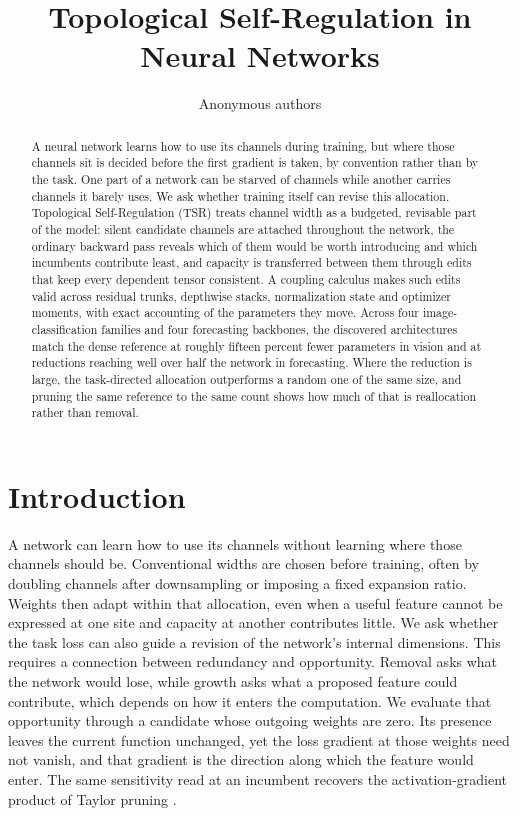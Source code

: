 \documentclass[10pt]{article}
\title{Topological Self-Regulation in Neural Networks}
\author{Anonymous authors}
\date{}
\theoremstyle{paper}
\begin{document}
\maketitle
\begin{abstract}
A neural network learns how to use its channels during training, but where those channels sit is decided before the first gradient is taken, by convention rather than by the task. One part of a network can be starved of channels while another carries channels it barely uses. We ask whether training itself can revise this allocation. Topological Self-Regulation (TSR) treats channel width as a budgeted, revisable part of the model: silent candidate channels are attached throughout the network, the ordinary backward pass reveals which of them would be worth introducing and which incumbents contribute least, and capacity is transferred between them through edits that keep every dependent tensor consistent. A coupling calculus makes such edits valid across residual trunks, depthwise stacks, normalization state and optimizer moments, with exact accounting of the parameters they move. Across four image-classification families and four forecasting backbones, the discovered architectures match the dense reference at roughly fifteen percent fewer parameters in vision and at reductions reaching well over half the network in forecasting. Where the reduction is large, the task-directed allocation outperforms a random one of the same size, and pruning the same reference to the same count shows how much of that is reallocation rather than removal.
\end{abstract}

\section{Introduction}
\label{sec:intro}
A network can learn how to use its channels without learning where those channels should be. Conventional widths are chosen before training, often by doubling channels after downsampling or imposing a fixed expansion ratio. Weights then adapt within that allocation, even when a useful feature cannot be expressed at one site and capacity at another contributes little. We ask whether the task loss can also guide a revision of the network's internal dimensions. This requires a connection between redundancy and opportunity. Removal asks what the network would lose, while growth asks what a proposed feature could contribute, which depends on how it enters the computation. We evaluate that opportunity through a candidate whose outgoing weights are zero. Its presence leaves the current function unchanged, yet the loss gradient at those weights need not vanish, and that gradient is the direction along which the feature would enter. The same sensitivity read at an incumbent recovers the activation-gradient product of Taylor pruning \citep{molchanov2017pruning}.
\end{document}
